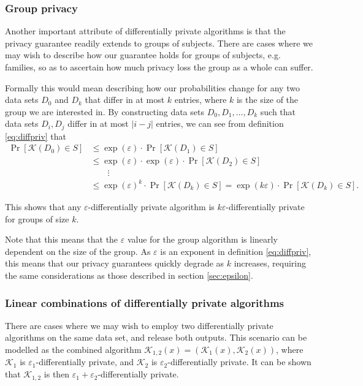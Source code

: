 \documentclass[12pt]{article}
\newcommand{\fancy}{\mathcal}
\renewcommand{\epsilon}{\varepsilon}
\begin{document}
\subsubsection{Group privacy}

Another important attribute of differentially private algorithms is that the privacy guarantee readily extends to groups of subjects. There are cases where we may wish to describe how our guarantee holds for groups of subjects, e.g. families, so as to ascertain how much privacy loss the group as a whole can suffer.

Formally this would mean describing how our probabilities change for any two data sets $D_0$ and $D_k$ that differ in at most $k$ entries, where $k$ is the size of the group we are interested in. By constructing data sets $D_0, D_1, \dots, D_k$ such that data sets $D_i,D_j$ differ in at most $|i-j|$ entries, we can see from definition \ref{eq:diffpriv} that
\begin{align*}
    \Pr[\fancy{K}(D_0) \in S] &\leq \exp(\epsilon) \cdot \Pr[\fancy{K}(D_1) \in S] \\
        &\leq \exp(\epsilon) \cdot \exp(\epsilon) \cdot \Pr[\fancy{K}(D_2) \in S] \\
        &\qquad\vdots \\
        &\leq \exp(\epsilon)^k \cdot \Pr[\fancy{K}(D_k) \in S] = \exp(k\epsilon) \cdot \Pr[\fancy{K}(D_k) \in S].
\end{align*}

This shows that any $\epsilon$-differentially private algorithm is $k\epsilon$-differentially private for groups of size $k$. \bigskip

Note that this means that the $\epsilon$ value for the group algorithm is linearly dependent on the size of the group. As $\epsilon$ is an exponent in definition \ref{eq:diffpriv}, this means that our privacy guarantees quickly degrade as $k$ increases, requiring the same considerations as those described in section \ref{sec:epsilon}.

\subsubsection{Linear combinations of differentially private algorithms}

There are cases where we may wish to employ two differentially private algorithms on the same data set, and release both outputs. This scenario can be modelled as the combined algorithm $\fancy{K}_{1,2}(x)=\left(\fancy{K}_1(x), \fancy{K}_2(x)\right)$, where $\fancy{K}_1$ is $\epsilon_1$-differentially private, and $\fancy{K}_2$ is $\epsilon_2$-differentially private. It can be shown that $\fancy{K}_{1,2}$ is then $\epsilon_1+\epsilon_2$-differentially private.
\end{document}
